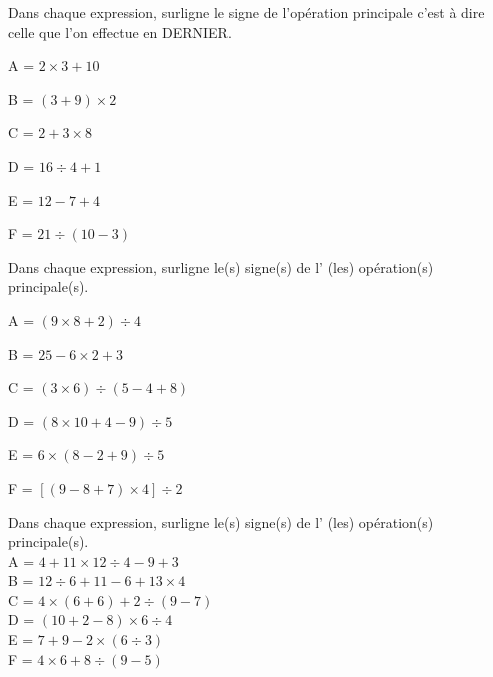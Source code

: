
\begin{exercice}
Dans chaque expression, surligne le signe de l'opération principale c'est à dire celle que l'on effectue en DERNIER.
 \begin{colitemize}{2}
 \item A = $2 \times 3 +10$
 \item  B = $(3+9) \times 2$
 \item C = $2+3 \times 8$
 \item D = $ 16 \div 4 + 1$
 \item E = $ 12 - 7 + 4$
 \item F = $ 21 \div (10-3)$
 \end{colitemize}
\end{exercice}

\begin{exercice}
Dans chaque expression, surligne le(s) signe(s) de l' (les) opération(s) principale(s).
 \begin{colitemize}{2}
 \item A = $(9 \times 8 + 2) \div 4$
 \item  B = $25 - 6 \times 2 +3 $
 \item C = $ (3 \times 6)\div(5-4+8)$
 \item D = $ (8 \times 10 + 4 -9) \div 5$
 \item E = $ 6 \times (8-2+9) \div 5$
 \item F = $ [(9-8+7)\times4]\div 2$
 \end{colitemize}
\end{exercice}

\begin{exercice}
Dans chaque expression, surligne le(s) signe(s) de l' (les) opération(s) principale(s).\\
A = $4 + 11\times 12\div 4 -9+3$\\
B = $12 \div 6+11-6+13 \times 4$\\
C = $4 \times (6+6)+2 \div (9-7)$\\
D = $(10+2-8) \times 6 \div 4$\\
E = $7+9-2 \times (6 \div 3)$\\
F = $4 \times 6 + 8 \div (9-5)$\\
\end{exercice}


